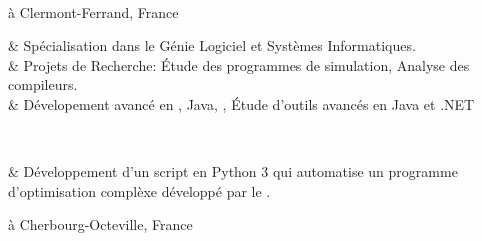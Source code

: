 	{\\ à Clermont-Ferrand, France}

\begin{cvstate}
	\begin{cvtable}{2.5ex}
		{\tiny {}} & Spécialisation dans le Génie Logiciel et Systèmes Informatiques.\\
		{\tiny {}} & Projets de Recherche: Étude des programmes de simulation, Analyse des compileurs.\\
		{\tiny {}} & Dévelopement avancé en \cplusplus, Java, \csharp, Étude d'outils avancés en Java et .NET\\
	\end{cvtable}

	\\
	\begin{cvtable}{2.5ex}
			{\tiny {}} & Développement d'un script en Python 3 qui automatise un programme d'optimisation complèxe développé par le .
	\end{cvtable}
\end{cvstate}

	{ à Cherbourg-Octeville, France}

\vspace{0.2cm}
